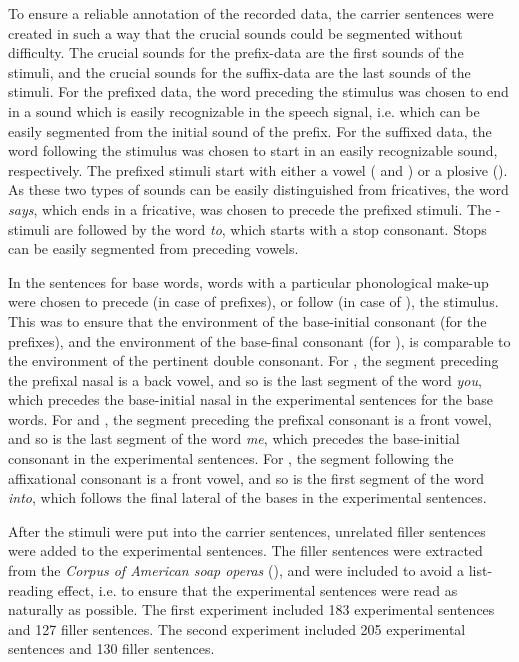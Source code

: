 To ensure a reliable annotation of the recorded data, the carrier sentences were created in such a way that the crucial sounds could be segmented without difficulty. The crucial sounds for the prefix-data are the first sounds of the stimuli, and the crucial sounds for the suffix-data are the last sounds of the stimuli. 
For the prefixed data, the word preceding the stimulus was chosen to end in a sound which is easily recognizable in the speech signal, i.e. which can be easily segmented from the initial sound of the prefix. For the suffixed data, the word following the stimulus was chosen to start in an easily recognizable sound, respectively. 
The prefixed stimuli start with either a vowel ( and ) or a plosive (). As these two types of sounds can be easily distinguished from fricatives,   the word \textit{says}, which ends in a fricative, was chosen to precede the prefixed stimuli. 
The -stimuli are followed by the word \textit{to}, which starts with a stop consonant. Stops can be easily segmented from preceding vowels.  


In the sentences for base words, words with a particular phonological make-up were chosen to precede (in case of prefixes), or follow (in case of ), the stimulus. This was to ensure that the environment of the base-initial consonant (for the prefixes), and the environment of the base-final consonant (for ), is comparable to the environment of the pertinent double consonant.
For , the segment preceding the prefixal nasal is a back vowel, and so is the last segment of the word \textit{you}, which precedes the base-initial nasal in the experimental sentences for the base words. 
For  and , the segment preceding the prefixal consonant is a front vowel, and so is the last segment of the word \textit{me}, which precedes the base-initial consonant in the experimental sentences. 
For , the segment following the affixational consonant is a front vowel, and so is the first segment of the word \textit{into}, which follows the final lateral of the bases in the experimental sentences. 




After the stimuli were put into the carrier sentences, unrelated filler sentences were added to the experimental sentences. The filler sentences were extracted from the \textit{Corpus of American soap operas} (\citealt{Davies.2011}), and were included  to avoid a list-reading effect, i.e. to ensure that the experimental sentences were read as naturally as possible. The first experiment included 183 experimental sentences and 127 filler sentences. The second experiment included 205 experimental sentences and 130 filler sentences. 

